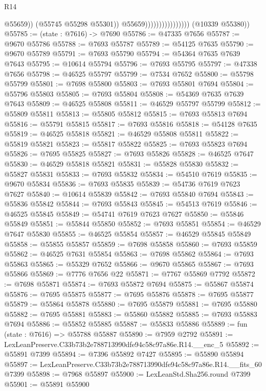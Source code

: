 \begin{lexlean}{R14}
\begin{coremodule}
                                            @55659))
                                        (@55745 @55298 @55301))
                                      @55659))))))))))))))))
      (@10339 @55380))
@55785 := (state : @7616) -> @7690
@55786 := @47335 @7656
@55787 := @9670 @55786
@55788 := @7693 @55787
@55789 := @54125 @7635
@55790 := @9670 @55789
@55791 := @7693 @55790
@55794 := @54364 @7635 @7639 @7643
@55795 := @10614 @55794
@55796 := @7693 @55795
@55797 := @47338 @7656
@55798 := @46525 @55797
@55799 := @7534 @7652
@55800 := @55798 @55799
@55801 := @7698 @55800
@55803 := @7693 @55801 @7694
@55804 := @55796 @55803
@55805 := @7693 @55804
@55808 := @54369 @7635 @7639 @7643
@55809 := @46525 @55808
@55811 := @46529 @55797 @55799
@55812 := @55809 @55811
@55813 := @55805 @55812
@55815 := @7693 @55813 @7694
@55816 := @55791 @55815
@55817 := @7693 @55816
@55818 := @54128 @7635
@55819 := @46525 @55818
@55821 := @46529 @55808 @55811
@55822 := @55819 @55821
@55823 := @55817 @55822
@55825 := @7693 @55823 @7694
@55826 := @7695 @55825
@55827 := @7693 @55826
@55828 := @46525 @7647
@55830 := @46529 @55818 @55821
@55831 := @55828 @55830
@55832 := @55827 @55831
@55833 := @7693 @55832
@55834 := @54510 @7619
@55835 := @9670 @55834
@55836 := @7693 @55835
@55839 := @54736 @7619 @7623 @7627
@55840 := @10614 @55839
@55842 := @7693 @55840 @7694
@55843 := @55836 @55842
@55844 := @7693 @55843
@55845 := @54513 @7619
@55846 := @46525 @55845
@55849 := @54741 @7619 @7623 @7627
@55850 := @55846 @55849
@55851 := @55844 @55850
@55852 := @7693 @55851
@55854 := @46529 @7647 @55830
@55855 := @46525 @55854
@55857 := @46529 @55845 @55849
@55858 := @55855 @55857
@55859 := @7698 @55858
@55860 := @7693 @55859
@55862 := @46525 @7631 @55854
@55863 := @7698 @55862
@55864 := @7693 @55863
@55865 := @55329 @7652
@55866 := @9670 @55865
@55867 := @7693 @55866
@55869 := @7776 @7656 @22
@55871 := @7767 @55869 @7792
@55872 := @7698 @55871
@55874 := @7693 @55872 @7694
@55875 := @55867 @55874
@55876 := @7695 @55875
@55877 := @7695 @55876
@55878 := @7695 @55877
@55879 := @55864 @55878
@55880 := @7695 @55879
@55881 := @7695 @55880
@55882 := @7695 @55881
@55883 := @55860 @55882
@55885 := @7693 @55883 @7694
@55886 := @55852 @55885
@55887 := @55833 @55886
@55889 := fun (state : @7616) => @55788 @55887
@55890 := @7959 @2792
@55891 := LexLeanPreserve.C33b73b2e788713990dfe94c58c97a86e.R14.__enc_5
@55892 := @55891 @7399
@55894 := @7396 @55892 @7427
@55895 := @55890 @55894
@55897 := LexLeanPreserve.C33b73b2e788713990dfe94c58c97a86e.R14.__fits_60 @7399
@55898 := @7968 @55897
@55900 := LexLeanStd.Sha256.round @7399
@55901 := @55891 @55900

\end{coremodule}
\end{lexlean}
